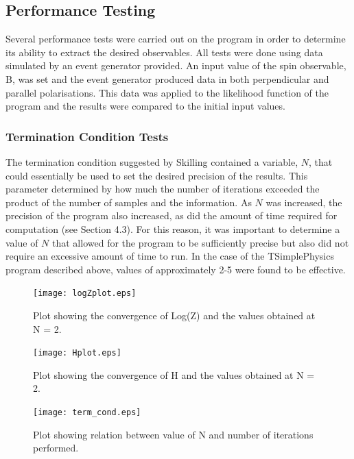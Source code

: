 \documentclass[a4paper,12pt]{article}
\begin{document}
\subsection{Performance Testing}
Several performance tests were carried out on the program in order to determine its ability to extract the desired observables.  All tests were done using data simulated by an event generator provided.  An input value of the spin observable, B, was set and the event generator produced data in both perpendicular and parallel polarisations.  This data was applied to the likelihood function of the program and the results were compared to the initial input values.
\subsubsection{Termination Condition Tests}
The termination condition suggested by Skilling \cite{skilling} contained a variable, $N$, that could essentially be used to set the desired precision of the results.  This parameter determined by how much the number of iterations exceeded the product of the number of samples and the information.  As $N$ was increased, the precision of the program also increased, as did the amount of time required for computation (see Section 4.3).  For this reason, it was important to determine a value of $N$ that allowed for the program to be sufficiently precise but also did not require an excessive amount of time to run.  In the case of the TSimplePhysics program described above, values of approximately 2-5 were found to be effective.


\begin{figure}[!h]
 \begin{center}
  \texttt{[image: logZplot.eps]}
  \caption{Plot showing the convergence of Log(Z) and the values obtained at N = 2.}
 \end{center}
\end{figure}


\begin{figure}[!h]
 \begin{center}
  \texttt{[image: Hplot.eps]}
  \caption{Plot showing the convergence of H and the values obtained at N = 2.}
 \end{center}
\end{figure}


\begin{figure}[!h]
 \begin{center}
  \texttt{[image: term\_cond.eps]}
  \caption{Plot showing relation between value of N and number of iterations performed.}
 \end{center}
\end{figure}
\newpage
\end{document}
